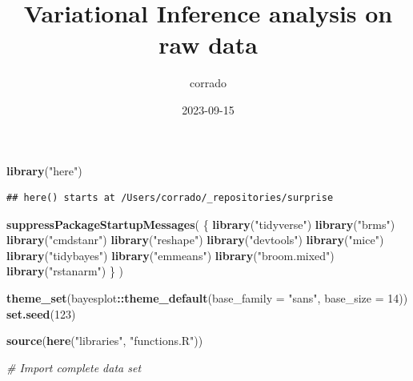 \documentclass[
]{article}
\title{Variational Inference analysis on raw data}
\author{corrado}
\date{2023-09-15}
\newenvironment{Shaded}{\begin{snugshade}}{\end{snugshade}}
\newcommand{\AttributeTok}[1]{\textcolor[rgb]{0.13,0.29,0.53}{#1}}
\newcommand{\CommentTok}[1]{\textcolor[rgb]{0.56,0.35,0.01}{\textit{#1}}}
\newcommand{\DecValTok}[1]{\textcolor[rgb]{0.00,0.00,0.81}{#1}}
\newcommand{\FunctionTok}[1]{\textcolor[rgb]{0.13,0.29,0.53}{\textbf{#1}}}
\newcommand{\NormalTok}[1]{#1}
\newcommand{\SpecialCharTok}[1]{\textcolor[rgb]{0.81,0.36,0.00}{\textbf{#1}}}
\newcommand{\StringTok}[1]{\textcolor[rgb]{0.31,0.60,0.02}{#1}}
\begin{document}
\maketitle

\begin{Shaded}
\begin{Highlighting}[]
\FunctionTok{library}\NormalTok{(}\StringTok{"here"}\NormalTok{)}
\end{Highlighting}
\end{Shaded}

\begin{verbatim}
## here() starts at /Users/corrado/_repositories/surprise
\end{verbatim}

\begin{Shaded}
\begin{Highlighting}[]
\FunctionTok{suppressPackageStartupMessages}\NormalTok{(}
\NormalTok{  \{}
    \FunctionTok{library}\NormalTok{(}\StringTok{"tidyverse"}\NormalTok{)}
    \FunctionTok{library}\NormalTok{(}\StringTok{"brms"}\NormalTok{)}
    \FunctionTok{library}\NormalTok{(}\StringTok{"cmdstanr"}\NormalTok{)}
    \FunctionTok{library}\NormalTok{(}\StringTok{"reshape"}\NormalTok{)}
    \FunctionTok{library}\NormalTok{(}\StringTok{"devtools"}\NormalTok{)}
    \FunctionTok{library}\NormalTok{(}\StringTok{"mice"}\NormalTok{)}
    \FunctionTok{library}\NormalTok{(}\StringTok{"tidybayes"}\NormalTok{)}
    \FunctionTok{library}\NormalTok{(}\StringTok{"emmeans"}\NormalTok{)}
    \FunctionTok{library}\NormalTok{(}\StringTok{"broom.mixed"}\NormalTok{)}
    \FunctionTok{library}\NormalTok{(}\StringTok{"rstanarm"}\NormalTok{)}
\NormalTok{  \}}
\NormalTok{)}

\FunctionTok{theme\_set}\NormalTok{(bayesplot}\SpecialCharTok{::}\FunctionTok{theme\_default}\NormalTok{(}\AttributeTok{base\_family =} \StringTok{"sans"}\NormalTok{, }\AttributeTok{base\_size =} \DecValTok{14}\NormalTok{))}
\FunctionTok{set.seed}\NormalTok{(}\DecValTok{123}\NormalTok{)}

\FunctionTok{source}\NormalTok{(}\FunctionTok{here}\NormalTok{(}\StringTok{"libraries"}\NormalTok{, }\StringTok{"functions.R"}\NormalTok{))}
\end{Highlighting}
\end{Shaded}

\begin{Shaded}
\begin{Highlighting}[]
\CommentTok{\# Import complete data set}
\end{Highlighting}
\end{Shaded}
\end{document}
